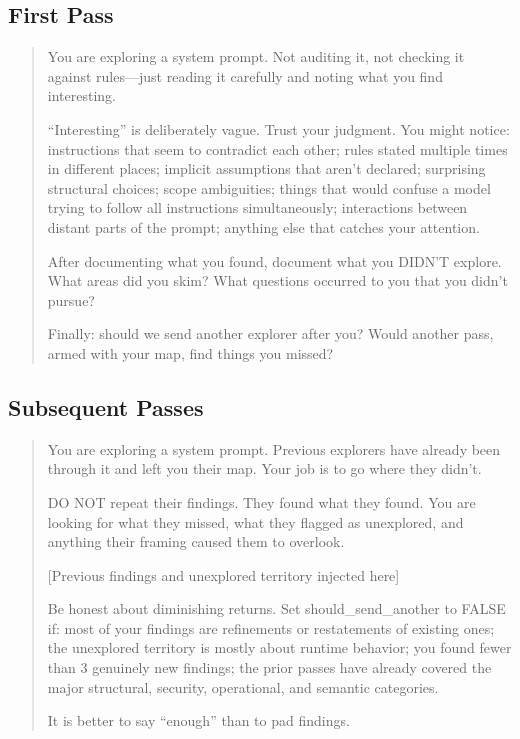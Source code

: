 \documentclass[11pt,a4paper]{article}
\begin{document}
\subsection{First Pass}

\begin{quote}
\ttfamily\small
You are exploring a system prompt. Not auditing it, not checking it
against rules---just reading it carefully and noting what you find
interesting.

\medskip

``Interesting'' is deliberately vague. Trust your judgment. You might
notice: instructions that seem to contradict each other; rules stated
multiple times in different places; implicit assumptions that aren't
declared; surprising structural choices; scope ambiguities; things that
would confuse a model trying to follow all instructions simultaneously;
interactions between distant parts of the prompt; anything else that
catches your attention.

\medskip

After documenting what you found, document what you DIDN'T explore.
What areas did you skim? What questions occurred to you that you didn't
pursue?

\medskip

Finally: should we send another explorer after you? Would another pass,
armed with your map, find things you missed?
\end{quote}

\subsection{Subsequent Passes}

\begin{quote}
\ttfamily\small
You are exploring a system prompt. Previous explorers have already been
through it and left you their map. Your job is to go where they didn't.

\medskip

DO NOT repeat their findings. They found what they found. You are
looking for what they missed, what they flagged as unexplored, and
anything their framing caused them to overlook.

\medskip

[Previous findings and unexplored territory injected here]

\medskip

Be honest about diminishing returns. Set should\_send\_another to FALSE
if: most of your findings are refinements or restatements of existing
ones; the unexplored territory is mostly about runtime behavior; you
found fewer than 3 genuinely new findings; the prior passes have
already covered the major structural, security, operational, and
semantic categories.

\medskip

It is better to say ``enough'' than to pad findings.
\end{quote}
\end{document}
